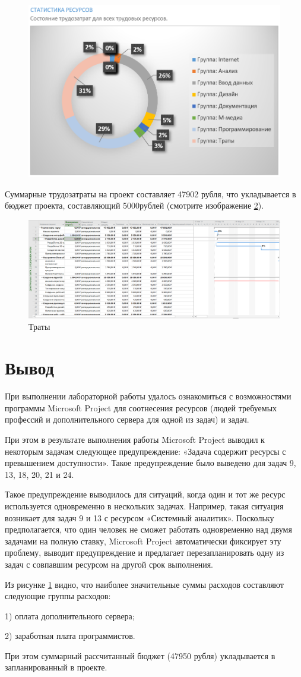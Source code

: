 \begin{figure}[H]
	\centering
	\includegraphics[width=0.7\linewidth]{src/task3_4}
	\caption{}
	\label{fig:task34}
\end{figure}

Суммарные трудозатраты на проект составляет 47902 рубля, что укладывается в бюджет проекта, составляющий 5000рублей (смотрите изображение \ref{fig:task35}).

\begin{figure}[H]
	\centering
	\includegraphics[width=0.7\linewidth]{src/task3_5}
	\caption{Траты}
	\label{fig:task35}
\end{figure}

\section{Вывод}
При выполнении лабораторной работы удалось ознакомиться с возможностями программы Microsoft Project для соотнесения ресурсов (людей требуемых профессий и дополнительного сервера для одной из задач) и задач.

При этом в результате выполнения работы Microsoft Project выводил к некоторым задачам следующее предупреждение: «Задача содержит ресурсы с превышением доступности». Такое предупреждение было выведено для задач 9, 13, 18, 20, 21 и 24.

Такое предупреждение выводилось для ситуаций, когда один и тот же ресурс используется одновременно в нескольких задачах. Например, такая ситуация возникает для задач 9 и 13 с ресурсом «Системный аналитик». Поскольку предполагается, что один человек не сможет работать одновременно над двумя задачами на полную ставку, Microsoft Project автоматически фиксирует эту проблему, выводит предупреждение и предлагает перезапланировать одну из задач с совпавшим ресурсом на другой срок выполнения.

Из рисунке \ref{fig:task34} видно, что наиболее значительные суммы расходов составляют следующие группы расходов:

1) оплата дополнительного сервера;

2) заработная плата программистов.

При этом суммарный рассчитанный бюджет (47950 рубля) укладывается в запланированный в проекте.











